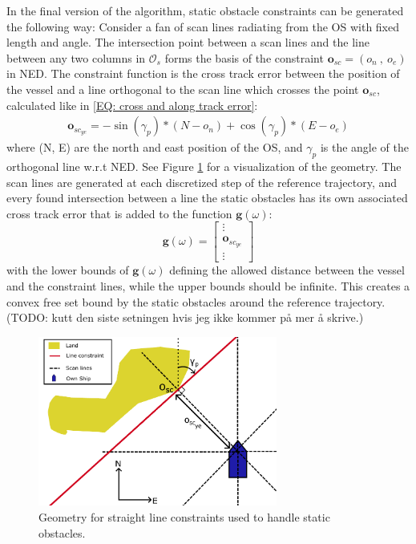 In the final version of the algorithm, static obstacle constraints can be generated the following way:\newline
Consider a fan of scan lines radiating from the \gls{OS} with fixed length and angle. The intersection
point between a scan lines and the line between any two columns in $\mathcal{O}_s$ forms the basis of the constraint 
$\mathbf{o}_{sc} = (o_n \ , \ o_e)$ in NED.\newline
The constraint function is the cross track error between the position of the vessel and a line orthogonal to the scan line which crosses
the point $\mathbf{o}_{sc}$, calculated like in \eqref{EQ: cross and along track error}:
\begin{eqnarray} \label{EQ: Static ye}
    \mathbf{o}_{sc_{ye}} = -\sin(\gamma_p)*(N-o_n) + \cos(\gamma_p)*(E-o_e)
\end{eqnarray}
where (N, E) are the north and east position of the \gls{OS}, and $\gamma_p$ is the angle of the orthogonal line w.r.t NED.
See Figure \ref{FIG: static_obs_ex} for a visualization of the geometry.
The scan lines are generated at each discretized step of the reference trajectory, and every found intersection between a 
line the static obstacles has its own associated cross track error that is added to the function $\textbf{g}(\omega)$:
\begin{equation}
    \textbf{g}(\omega) = \begin{bmatrix}
        \vdots \\
        \mathbf{o}_{sc_{ye}} \\
        \vdots
    \end{bmatrix}
\end{equation}
with the lower bounds of $\textbf{g}(\omega)$ defining the allowed distance between the vessel and the constraint lines, while the upper bounds
should be infinite. This creates a convex free set bound by the static obstacles around the reference trajectory. 
(TODO: kutt den siste setningen hvis jeg ikke kommer på mer å skrive.)

\begin{figure}[th!]
    \centering
    \includegraphics[width=0.7\textwidth]{Images/StaticObs_example.pdf}
    \caption{Geometry for straight line constraints used to handle static obstacles.}
    \label{FIG: static_obs_ex}
\end{figure}


